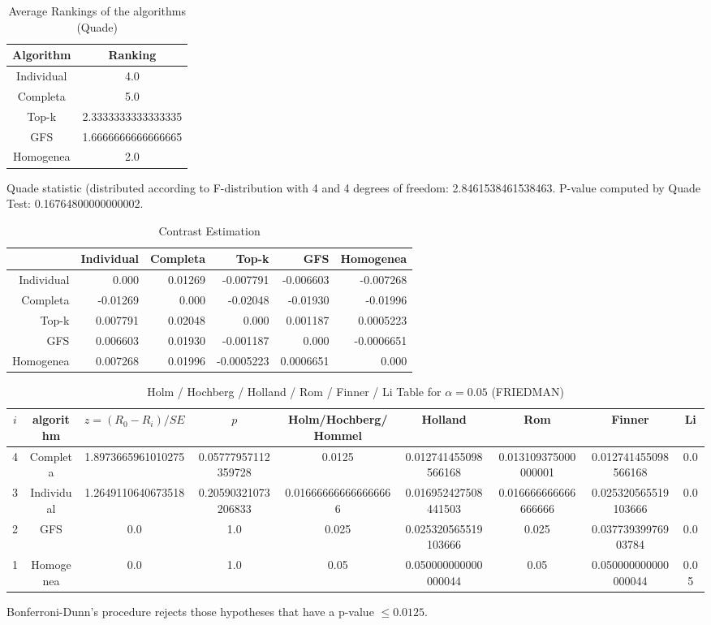 \documentclass[a4paper,10pt]{article}
\begin{document}
\begin{landscape}
\newpage

\begin{table}[!htp]
\centering
\caption{Average Rankings of the algorithms (Quade)
}\begin{tabular}{c|c}
Algorithm&Ranking\\
\hline
Individual&4.0\\
Completa&5.0\\
Top-k&2.3333333333333335\\
GFS&1.6666666666666665\\
Homogenea&2.0\\
\end{tabular}
\end{table}
Quade statistic (distributed according to F-distribution with 4 and 4 degrees of freedom: 2.8461538461538463. 
P-value computed by Quade Test: 0.16764800000000002.\newline


\newpage

\begin{table}[!htp]
\centering\tiny
\caption{Contrast Estimation}
\begin{tabular}{
|r|r|r|r|r|r|}
\hline
 &Individual&Completa&Top-k&GFS&Homogenea\\
\hline
Individual&0.000&0.01269&-0.007791&-0.006603&-0.007268\\
\hline
Completa&-0.01269&0.000&-0.02048&-0.01930&-0.01996\\
\hline
Top-k&0.007791&0.02048&0.000&0.001187&0.0005223\\
\hline
GFS&0.006603&0.01930&-0.001187&0.000&-0.0006651\\
\hline
Homogenea&0.007268&0.01996&-0.0005223&0.0006651&0.000\\
\hline

\end{tabular}
\end{table}

\newpage

\begin{table}[!htp]
\centering\scriptsize
\caption{Holm / Hochberg / Holland / Rom / Finner / Li Table for $\alpha=0.05$ (FRIEDMAN)}
\begin{tabular}{ccccccccc}
$i$&algorithm&$z=(R_0 - R_i)/SE$&$p$&Holm/Hochberg/Hommel&Holland&Rom&Finner&Li\\
\hline
4&Completa&1.8973665961010275&0.05777957112359728&0.0125&0.012741455098566168&0.013109375000000001&0.012741455098566168&0.0\\
3&Individual&1.2649110640673518&0.20590321073206833&0.016666666666666666&0.016952427508441503&0.016666666666666666&0.025320565519103666&0.0\\
2&GFS&0.0&1.0&0.025&0.025320565519103666&0.025&0.03773939976903784&0.0\\
1&Homogenea&0.0&1.0&0.05&0.050000000000000044&0.05&0.050000000000000044&0.05\\
\hline
\end{tabular}
\end{table}
Bonferroni-Dunn's procedure rejects those hypotheses that have a p-value $\le0.0125$.



\end{landscape}
\end{document}
